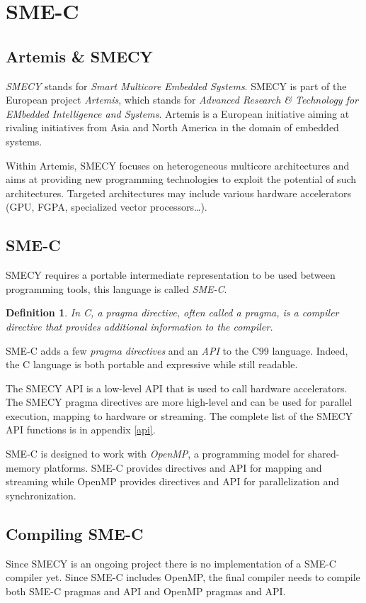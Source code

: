 \documentclass[a4paper]{article}
\newtheorem{defdef}{Definition}
\begin{document}
\section{SME-C}
	\subsection{Artemis \& SMECY}
 	\emph{SMECY} stands for \emph{Smart Multicore Embedded Systems}. SMECY is part of the European project \emph{Artemis}, which stands for \emph{Advanced Research \& Technology for EMbedded Intelligence and Systems}. Artemis is a European initiative aiming at rivaling initiatives from Asia and North America in the domain of embedded systems.
	
	Within Artemis, SMECY focuses on heterogeneous multicore architectures and aims at providing new programming technologies to exploit the potential of such architectures. Targeted architectures may include various hardware accelerators (GPU, FGPA, specialized vector processors\ldots).

	\subsection{SME-C}
	SMECY requires a portable intermediate representation to be used between programming tools, this language is called \emph{SME-C}.
	
	\begin{defdef} In C, a \emph{pragma directive}, often called a \emph{pragma}, is a compiler directive that provides additional information to the compiler.
	\end{defdef}
	
	SME-C adds a few \emph{pragma directives} and an \emph{API} to the C99 language. Indeed, the C language is both portable and expressive while still readable.
	
	The SMECY API is a low-level API that is used to call hardware accelerators. The SMECY pragma directives are more high-level and can be used for parallel execution, mapping to hardware or streaming. The complete list of the SMECY API functions is in appendix \ref{api}.
	
	SME-C is designed to work with \emph{OpenMP}, a programming model for shared-memory platforms. SME-C provides directives and API for mapping and streaming while OpenMP provides directives and API for parallelization and synchronization.
	
	\subsection{Compiling SME-C}
	Since SMECY is an ongoing project there is no implementation of a SME-C compiler yet. Since SME-C includes OpenMP, the final compiler needs to compile both SME-C pragmas and API and OpenMP pragmas and API.
	
\end{document}
